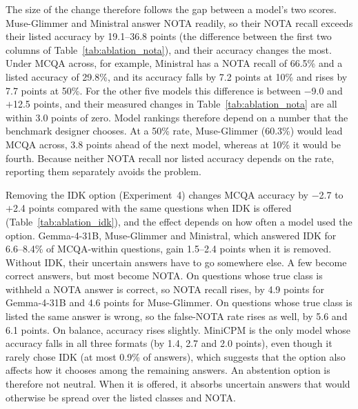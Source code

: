 \documentclass[10pt,letterpaper]{article}
\newcommand{\tablefont}{\footnotesize}
\begin{document}
The size of the change therefore follows the gap between a model's two scores. Muse-Glimmer and Ministral answer NOTA readily, so their NOTA recall exceeds their listed accuracy by 19.1--36.8 points (the difference between the first two columns of Table~\ref{tab:ablation_nota}), and their accuracy changes the most. Under MCQA across, for example, Ministral has a NOTA recall of 66.5\% and a listed accuracy of 29.8\%, and its accuracy falls by 7.2 points at 10\% and rises by 7.7 points at 50\%. For the other five models this difference is between $-$9.0 and $+$12.5 points, and their measured changes in Table~\ref{tab:ablation_nota} are all within 3.0 points of zero. Model rankings therefore depend on a number that the benchmark designer chooses. At a 50\% rate, Muse-Glimmer (60.3\%) would lead MCQA across, 3.8 points ahead of the next model, whereas at 10\% it would be fourth. Because neither NOTA recall nor listed accuracy depends on the rate, reporting them separately avoids the problem.

\begin{table}[!tbp]
\centering
\caption{Removing ``I don't know'' (Experiment 4; seed 0, seven models). IDK (\%) is the share of answers that are ``I don't know'' when the option is offered, and $\Delta$Acc.\ the change in accuracy (points) when it is removed, compared item by item with the same questions with IDK offered. $^{*}$95\% paired bootstrap CI over datasets excludes 0. VQA MC values are dominated by a single MIRAGE question (Section~\ref{sec:results_stability}).}
\label{tab:ablation_idk}
\renewcommand{\arraystretch}{1.2}
\tablefont

\end{table}

Removing the IDK option (Experiment~4) changes MCQA accuracy by $-$2.7 to $+$2.4 points compared with the same questions when IDK is offered (Table~\ref{tab:ablation_idk}), and the effect depends on how often a model used the option. Gemma-4-31B, Muse-Glimmer and Ministral, which answered IDK for 6.6--8.4\% of MCQA-within questions, gain 1.5--2.4 points when it is removed. Without IDK, their uncertain answers have to go somewhere else. A few become correct answers, but most become NOTA. On questions whose true class is withheld a NOTA answer is correct, so NOTA recall rises, by 4.9 points for Gemma-4-31B and 4.6 points for Muse-Glimmer. On questions whose true class is listed the same answer is wrong, so the false-NOTA rate rises as well, by 5.6 and 6.1 points. On balance, accuracy rises slightly. MiniCPM is the only model whose accuracy falls in all three formats (by 1.4, 2.7 and 2.0 points), even though it rarely chose IDK (at most 0.9\% of answers), which suggests that the option also affects how it chooses among the remaining answers. An abstention option is therefore not neutral. When it is offered, it absorbs uncertain answers that would otherwise be spread over the listed classes and NOTA.
\end{document}
